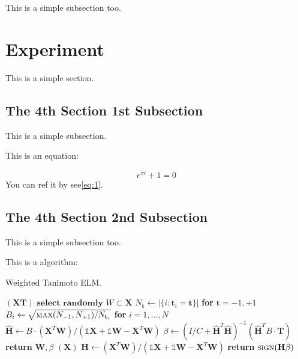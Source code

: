 \documentclass[lettersize,journal,12pt]{IEEEtran}
\begin{document}
This is a simple subsection too.
\section{Experiment}

This is a simple section.
\subsection{The 4th Section 1st Subsection}

This is a simple subsection.

This is an equation:

\begin{equation}
	\label{eq:1}
	e^{\pi i} + 1 = 0
\end{equation}
You can ref it by see\eqref{eq:1}.

\subsection{The 4th Section 2nd Subsection}

This is a simple subsection too.

This is a algorithm:

\begin{algorithm}[H]
	\caption{Weighted Tanimoto ELM.}\label{alg:alg1}
	\begin{algorithmic}
		\STATE
		$(\mathbf{X} \mathbf{T})$
		\STATE \hspace{0.5cm}$ \textbf{select randomly } W \subset \mathbf{X}  $
		\STATE \hspace{0.5cm}$ N_\mathbf{t} \gets | \{ i : \mathbf{t}_i = \mathbf{t} \} | $ \textbf{ for } $ \mathbf{t}= -1,+1 $
		\STATE \hspace{0.5cm}$ B_i \gets \sqrt{ \textsc{max}(N_{-1},N_{+1}) / N_{\mathbf{t}_i} } $ \textbf{ for } $ i = 1,...,N $
		\STATE \hspace{0.5cm}$ \hat{\mathbf{H}} \gets  B \cdot (\mathbf{X}^T\textbf{W})/( \mathbb{1}\mathbf{X} + \mathbb{1}\textbf{W} - \mathbf{X}^T\textbf{W} ) $
		\STATE \hspace{0.5cm}$ \beta \gets \left ( I/C + \hat{\mathbf{H}}^T\hat{\mathbf{H}} \right )^{-1}(\hat{\mathbf{H}}^T B\cdot \mathbf{T})  $
		\STATE \hspace{0.5cm}\textbf{return}  $\textbf{W},  \beta $
		\STATE
		$(\mathbf{X} )$
		\STATE \hspace{0.5cm}$ \mathbf{H} \gets  (\mathbf{X}^T\textbf{W} )/( \mathbb{1}\mathbf{X}  + \mathbb{1}\textbf{W}- \mathbf{X}^T\textbf{W}  ) $
		\STATE \hspace{0.5cm}\textbf{return}  $\textsc{sign}( \mathbf{H} \beta )$
	\end{algorithmic}
	\label{alg1}
\end{algorithm}
\end{document}
